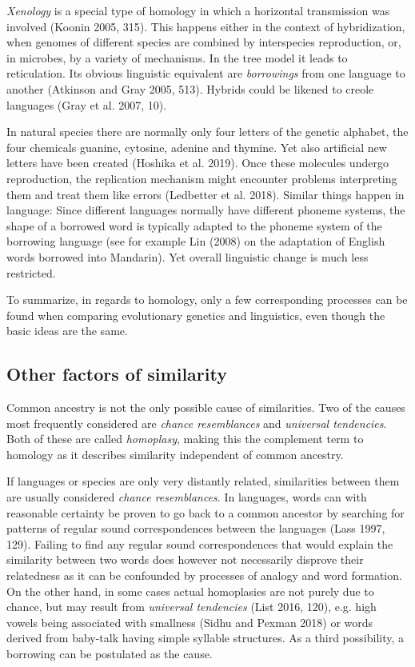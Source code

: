 \documentclass[
  a4paper,
  14pt,
  oneside,
  tablecaptionabove
]{scrbook}
\begin{document}
\emph{Xenology} is a special type of homology in which a horizontal transmission was involved
(Koonin 2005, 315). This happens either in the context of hybridization, when genomes of
different species are combined by interspecies reproduction, or, in microbes, by a variety of
mechanisms. In the tree model it leads to reticulation. Its obvious linguistic equivalent are
\emph{borrowings} from one language to another (Atkinson and Gray 2005, 513). Hybrids could be likened to creole languages (Gray et al. 2007, 10).

In natural species there are normally only four letters of the genetic alphabet, the four chemicals guanine, cytosine, adenine and thymine. Yet also artificial new letters have been created (Hoshika et al. 2019). Once these molecules undergo reproduction, the replication mechanism might encounter problems interpreting them and treat them like errors (Ledbetter et al. 2018). Similar things happen in language: Since different languages normally have different phoneme systems, the shape of a borrowed word is typically adapted to the phoneme system of the borrowing language (see for example Lin (2008) on the adaptation of English words borrowed into Mandarin). Yet overall linguistic change is much less restricted.

To summarize, in regards to homology, only a few corresponding processes can be found when comparing evolutionary genetics and linguistics, even though the basic ideas are the same.

\subsection*{Other factors of similarity}

Common ancestry is not the only possible cause of similarities. Two of the causes most frequently considered are
\emph{chance resemblances} and \emph{universal tendencies}. Both of these are called
\emph{homoplasy}, making this the complement term to homology as it describes similarity independent of common ancestry.

If languages or species are only very distantly related, similarities between them are usually
considered \emph{chance resemblances}. In languages, words can with reasonable certainty be proven to go back to a common ancestor by searching for patterns of regular sound correspondences between the languages (Lass 1997, 129). Failing to find any regular sound correspondences that would explain the similarity between two words does however not necessarily disprove their relatedness as it can be confounded by processes of analogy and word formation. On the other hand, in some cases actual homoplasies are not purely due to chance, but may result from
\emph{universal tendencies} (List 2016, 120), e.g. high vowels being associated with smallness (Sidhu and Pexman 2018) or words derived from baby-talk having simple syllable structures. As a third possibility, a borrowing can be postulated as the cause.
\end{document}
